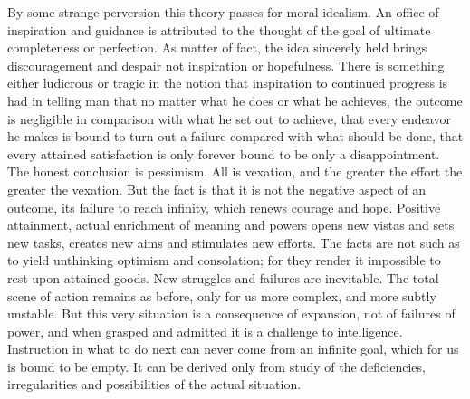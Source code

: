 \documentclass[12pt]{article}
\begin{document}
By some strange perversion this theory passes for
moral idealism. An office of inspiration and guidance is
attributed to the thought of the goal of ultimate completeness
or perfection. As matter of fact, the idea
sincerely held brings discouragement and despair not
inspiration or hopefulness. There is something either
ludicrous or tragic in the notion that inspiration to
continued progress is had in telling man that no matter
what he does or what he achieves, the outcome is negligible
in comparison with what he set out to achieve, that
every endeavor he makes is bound to turn out a failure
compared with what should be done, that every attained
satisfaction is only forever bound to be only a
disappointment. The honest conclusion is pessimism.
All is vexation, and the greater the effort the greater
the vexation. But the fact is that it is not the negative
aspect of an outcome, its failure to reach infinity,
which renews courage and hope. Positive attainment,
actual enrichment of meaning and powers opens new
vistas and sets new tasks, creates new aims and stimulates
new efforts. The facts are not such as to yield
unthinking optimism and consolation; for they render
it impossible to rest upon attained goods. New struggles
and failures are inevitable. The total scene of
action remains as before, only for us more complex,
and more subtly unstable. But this very situation is a
consequence of expansion, not of failures of power, and
when grasped and admitted it is a challenge to intelligence.
Instruction in what to do next can never come
from an infinite goal, which for us is bound to be empty.
It can be derived only from study of the deficiencies,
irregularities and possibilities of the actual situation.
\end{document}
